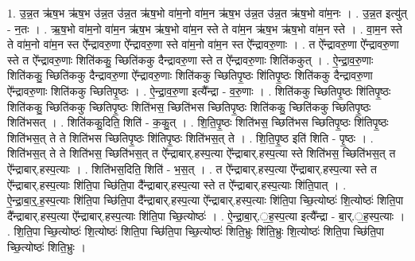 \documentclass[17pt]{extarticle}
\begin{document}
1. उ॒न्न॒त ऋ॑ष॒भ ऋ॑ष॒भ उ॑न्न॒त उ॑न्न॒त ऋ॑ष॒भो वा॑म॒नो वा॑म॒न ऋ॑ष॒भ उ॑न्न॒त उ॑न्न॒त ऋ॑ष॒भो वा॑म॒नः । . उ॒न्न॒त इत्यु॑त् - न॒तः । . ऋ॒ष॒भो वा॑म॒नो वा॑म॒न ऋ॑ष॒भ ऋ॑ष॒भो वा॑म॒न स्ते ते वा॑म॒न ऋ॑ष॒भ ऋ॑ष॒भो वा॑म॒न स्ते । . वा॒म॒न स्ते ते वा॑म॒नो वा॑म॒न स्त ऐ᳚न्द्रावरु॒णा ऐ᳚न्द्रावरु॒णा स्ते वा॑म॒नो वा॑म॒न स्त ऐ᳚न्द्रावरु॒णाः । . त ऐ᳚न्द्रावरु॒णा ऐ᳚न्द्रावरु॒णा स्ते त ऐ᳚न्द्रावरु॒णाः शिति॑ककु॒ च्छिति॑ककु दैन्द्रावरु॒णा स्ते त ऐ᳚न्द्रावरु॒णाः शिति॑ककुत् । . ऐ॒न्द्रा॒व॒रु॒णाः शिति॑ककु॒ च्छिति॑ककु दैन्द्रावरु॒णा ऐ᳚न्द्रावरु॒णाः शिति॑ककु च्छितिपृ॒ष्ठः शि॑तिपृ॒ष्ठः शिति॑ककु दैन्द्रावरु॒णा ऐ᳚न्द्रावरु॒णाः शिति॑ककु च्छितिपृ॒ष्ठः । . ऐ॒न्द्रा॒व॒रु॒णा इत्यै᳚न्द्रा - व॒रु॒णाः । . शिति॑ककु च्छितिपृ॒ष्ठः शि॑तिपृ॒ष्ठः शिति॑ककु॒ च्छिति॑ककु च्छितिपृ॒ष्ठः शिति॑भस॒ च्छिति॑भस
च्छितिपृ॒ष्ठः शिति॑ककु॒ च्छिति॑ककु च्छितिपृ॒ष्ठः शिति॑भसत् । . शिति॑ककु॒दिति॒ शिति॑ - क॒कु॒त् । . शि॒ति॒पृ॒ष्ठः शिति॑भस॒ च्छिति॑भस च्छितिपृ॒ष्ठः शि॑तिपृ॒ष्ठः शिति॑भस॒त् ते ते शिति॑भस च्छितिपृ॒ष्ठः शि॑तिपृ॒ष्ठः शिति॑भस॒त् ते । . शि॒ति॒पृ॒ष्ठ इति॑ शिति - पृ॒ष्ठः । . शिति॑भस॒त् ते ते शिति॑भस॒ च्छिति॑भस॒त् त ऐ᳚न्द्राबार्.हस्प॒त्या ऐ᳚न्द्राबार्.हस्प॒त्या स्ते शिति॑भस॒ च्छिति॑भस॒त् त ऐ᳚न्द्राबार्.हस्प॒त्याः । . शिति॑भस॒दिति॒ शिति॑ - भ॒स॒त् । . त ऐ᳚न्द्राबार्.हस्प॒त्या ऐ᳚न्द्राबार्.हस्प॒त्या स्ते त ऐ᳚न्द्राबार्.हस्प॒त्याः शि॑ति॒पा च्छि॑ति॒पा दै᳚न्द्राबार्.हस्प॒त्या स्ते त ऐ᳚न्द्राबार्.हस्प॒त्याः शि॑ति॒पात् । . ऐ॒न्द्रा॒बा॒र्॒.ह॒स्प॒त्याः शि॑ति॒पा च्छि॑ति॒पा दै᳚न्द्राबार्.हस्प॒त्या ऐ᳚न्द्राबार्.हस्प॒त्याः शि॑ति॒पा च्छि॒त्योष्ठः॑ शि॒त्योष्ठः॑ शिति॒पा दै᳚न्द्राबार्.हस्प॒त्या ऐ᳚न्द्राबार्.हस्प॒त्याः शि॑ति॒पा च्छि॒त्योष्ठः॑ । . ऐ॒न्द्रा॒बा॒र्.॒ह॒स्प॒त्या इत्यै᳚न्द्रा - बा॒र्.॒ह॒स्प॒त्याः । . शि॒ति॒पा च्छि॒त्योष्ठः॑ शि॒त्योष्ठः॑ शिति॒पा च्छि॑ति॒पा च्छि॒त्योष्ठः॑ शिति॒भ्रुः शि॑ति॒भ्रुः शि॒त्योष्ठः॑ शिति॒पा
च्छि॑ति॒पा च्छि॒त्योष्ठः॑ शिति॒भ्रुः । \newline
\end{document}
